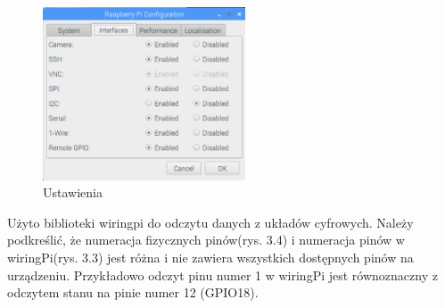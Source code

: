 \begin{figure}[h]
	\centering
	\includegraphics[width=6cm]{RSettings}
	\caption{Ustawienia}
\end{figure}
Użyto biblioteki wiringpi do odczytu danych z układów cyfrowych. Należy podkreślić, że numeracja fizycznych pinów(rys. 3.4) i numeracja pinów w wiringPi(rys. 3.3) jest różna i nie zawiera wszystkich dostępnych pinów na urządzeniu. Przykładowo odczyt pinu numer 1 w wiringPi jest równoznaczny z odczytem stanu na pinie numer 12 (GPIO18).
